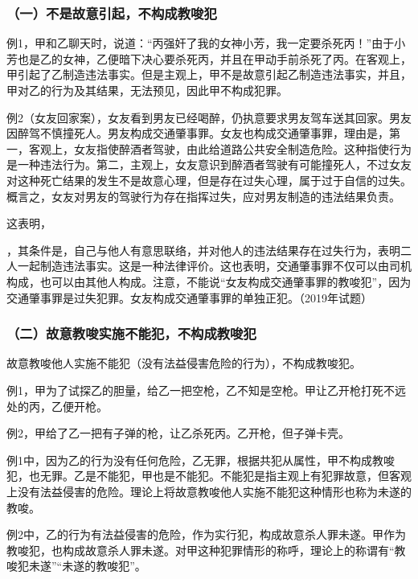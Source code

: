 \subsubsection*{（一）不是故意引起，不构成教唆犯}

例1，甲和乙聊天时，说道：“丙强奸了我的女神小芳，我一定要杀死丙！”由于小芳也是乙的女神，乙便暗下决心要杀死丙，并且在甲动手前杀死了丙。在客观上，甲引起了乙制造违法事实。但是主观上，甲不是故意引起乙制造违法事实，并且，甲对乙的行为及其结果，无法预见，因此甲不构成犯罪。

例2（女友回家案），女友看到男友已经喝醉，仍执意要求男友驾车送其回家。男友因醉驾不慎撞死人。男友构成交通肇事罪。女友也构成交通肇事罪，理由是，第一，客观上，女友指使醉酒者驾驶，由此给道路公共安全制造危险。这种指使行为是一种违法行为。第二，主观上，女友意识到醉酒者驾驶有可能撞死人，不过女友对这种死亡结果的发生不是故意心理，但是存在过失心理，属于过于自信的过失。概言之，女友对男友的驾驶行为存在指挥过失，应对男友制造的违法结果负责。

这表明，

，其条件是，自己与他人有意思联络，并对他人的违法结果存在过失行为，表明二人一起制造违法事实。这是一种法律评价。这也表明，交通肇事罪不仅可以由司机构成，也可以由其他人构成。注意，不能说“女友构成交通肇事罪的教唆犯”，因为交通肇事罪是过失犯罪。女友构成交通肇事罪的单独正犯。（2019年试题）

\subsubsection*{（二）故意教唆实施不能犯，不构成教唆犯}

故意教唆他人实施不能犯（没有法益侵害危险的行为），不构成教唆犯。

例1，甲为了试探乙的胆量，给乙一把空枪，乙不知是空枪。甲让乙开枪打死不远处的丙，乙便开枪。

例2，甲给了乙一把有子弹的枪，让乙杀死丙。乙开枪，但子弹卡壳。

例1中，因为乙的行为没有任何危险，乙无罪，根据共犯从属性，甲不构成教唆犯，也无罪。乙是不能犯，甲也是不能犯。不能犯是指主观上有犯罪故意，但客观上没有法益侵害的危险。理论上将故意教唆他人实施不能犯这种情形也称为未遂的教唆。

例2中，乙的行为有法益侵害的危险，作为实行犯，构成故意杀人罪未遂。甲作为教唆犯，也构成故意杀人罪未遂。对甲这种犯罪情形的称呼，理论上的称谓有“教唆犯未遂”“未遂的教唆犯”。

